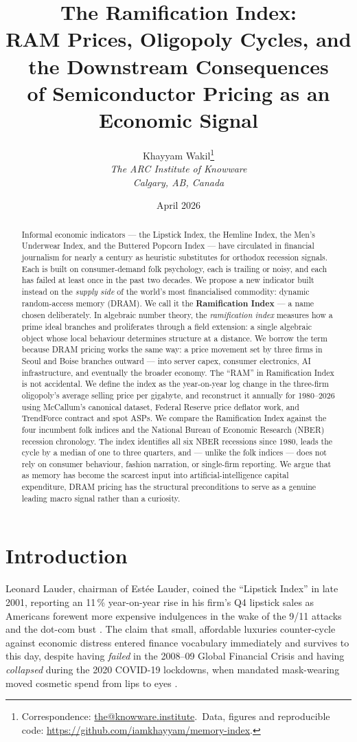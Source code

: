 \documentclass[11pt,a4paper]{article}
\title{\textbf{The Ramification Index:\\
RAM Prices, Oligopoly Cycles, and the Downstream Consequences\\
of Semiconductor Pricing as an Economic Signal}}
\author{%
  Khayyam Wakil\thanks{Correspondence: \href{mailto:the@knowware.institute}{the@knowware.institute}.\ Data, figures and reproducible code: \url{https://github.com/iamkhayyam/memory-index}.}\\
  \textit{The ARC Institute of Knowware}\\
  \textit{Calgary, AB, Canada}
}
\date{April 2026}
\begin{document}
\maketitle

\begin{abstract}
Informal economic indicators --- the Lipstick Index, the Hemline Index, the Men's Underwear Index, and the Buttered Popcorn Index --- have circulated in financial journalism for nearly a century as heuristic substitutes for orthodox recession signals. Each is built on consumer-demand folk psychology, each is trailing or noisy, and each has failed at least once in the past two decades. We propose a new indicator built instead on the \emph{supply side} of the world's most financialised commodity: dynamic random-access memory (DRAM). We call it the \textbf{Ramification Index} --- a name chosen deliberately. In algebraic number theory, the \emph{ramification index} measures how a prime ideal branches and proliferates through a field extension: a single algebraic object whose local behaviour determines structure at a distance. We borrow the term because DRAM pricing works the same way: a price movement set by three firms in Seoul and Boise branches outward --- into server capex, consumer electronics, AI infrastructure, and eventually the broader economy. The ``RAM'' in Ramification Index is not accidental. We define the index as the year-on-year log change in the three-firm oligopoly's average selling price per gigabyte, and reconstruct it annually for 1980--2026 using McCallum's canonical dataset, Federal Reserve price deflator work, and TrendForce contract and spot ASPs. We compare the Ramification Index against the four incumbent folk indices and the National Bureau of Economic Research (NBER) recession chronology. The index identifies all six NBER recessions since 1980, leads the cycle by a median of one to three quarters, and --- unlike the folk indices --- does not rely on consumer behaviour, fashion narration, or single-firm reporting. We argue that as memory has become the scarcest input into artificial-intelligence capital expenditure, DRAM pricing has the structural preconditions to serve as a genuine leading macro signal rather than a curiosity.
\end{abstract}

\section{Introduction}
\label{sec:intro}

Leonard Lauder, chairman of Est\'ee Lauder, coined the ``Lipstick Index'' in late 2001, reporting an 11\,\% year-on-year rise in his firm's Q4 lipstick sales as Americans forewent more expensive indulgences in the wake of the 9/11 attacks and the dot-com bust \citep{nelson2001,schor1999,hill2012}. The claim that small, affordable luxuries counter-cycle against economic distress entered finance vocabulary immediately and survives to this day, despite having \emph{failed} in the 2008--09 Global Financial Crisis and having \emph{collapsed} during the 2020 COVID-19 lockdowns, when mandated mask-wearing moved cosmetic spend from lips to eyes \citep{schaefer2008,tan2008,scott2020,bryan2022}.
\end{document}
